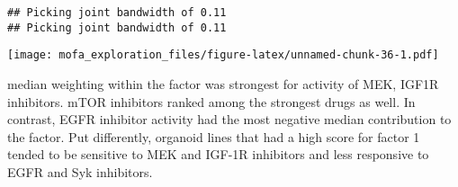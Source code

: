 \documentclass[
]{article}
\newenvironment{Shaded}{\begin{snugshade}}{\end{snugshade}}
\newcommand{\CommentTok}[1]{\textcolor[rgb]{0.56,0.35,0.01}{\textit{#1}}}
\newcommand{\DataTypeTok}[1]{\textcolor[rgb]{0.13,0.29,0.53}{#1}}
\newcommand{\DecValTok}[1]{\textcolor[rgb]{0.00,0.00,0.81}{#1}}
\newcommand{\KeywordTok}[1]{\textcolor[rgb]{0.13,0.29,0.53}{\textbf{#1}}}
\newcommand{\NormalTok}[1]{#1}
\newcommand{\OperatorTok}[1]{\textcolor[rgb]{0.81,0.36,0.00}{\textbf{#1}}}
\newcommand{\StringTok}[1]{\textcolor[rgb]{0.31,0.60,0.02}{#1}}
\begin{document}
\begin{Shaded}
\end{Shaded}

\begin{verbatim}
## Picking joint bandwidth of 0.11
## Picking joint bandwidth of 0.11
\end{verbatim}

\texttt{[image: mofa\_exploration\_files/figure-latex/unnamed-chunk-36-1.pdf]}

median weighting within the factor was strongest for activity of MEK,
IGF1R inhibitors. mTOR inhibitors ranked among the strongest drugs as
well. In contrast, EGFR inhibitor activity had the most negative median
contribution to the factor. Put differently, organoid lines that had a
high score for factor 1 tended to be sensitive to MEK and IGF-1R
inhibitors and less responsive to EGFR and Syk inhibitors.
\end{document}
